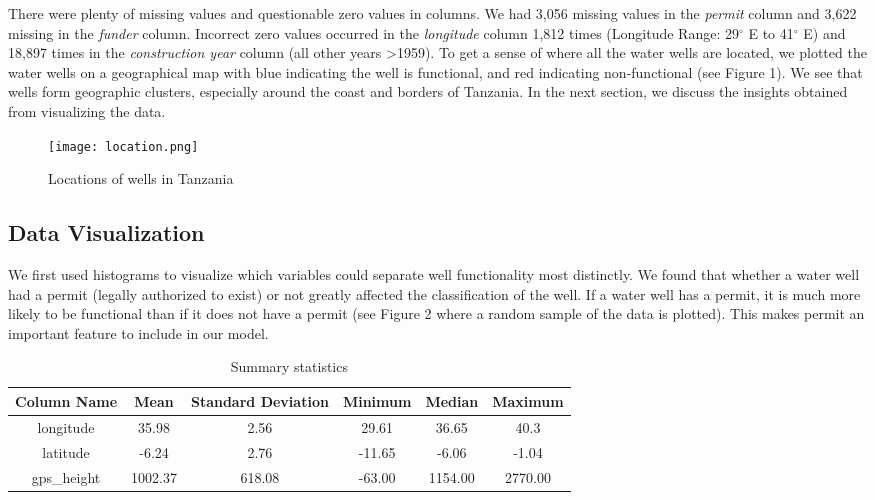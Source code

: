 \documentclass[10pt]{SelfArx} %
\begin{document}
There were plenty of missing values and questionable zero values in columns. We had 3,056 missing values in the \textit{permit} column and 3,622 missing in the \textit{funder} column. Incorrect zero values occurred in the \textit{longitude} column 1,812 times (Longitude Range: 29$^\circ$ E to 41$^\circ$ E) and 18,897 times in the \textit{construction year} column (all other years >1959). To get a sense of where all the water wells are located, we plotted the water wells on a geographical map with blue indicating the well is functional, and red indicating non-functional (see Figure 1). We see that wells form geographic clusters, especially around the coast and borders of Tanzania. In the next section, we discuss the insights obtained from visualizing the data.


\begin{figure}[ht]\centering
\captionsetup{skip=0.5cm}
\texttt{[image: location.png]}
\caption{Locations of wells in Tanzania}
\label{fig:map}
\end{figure}


\subsection{Data Visualization}

We first used histograms to visualize which variables could separate well functionality most distinctly. We found that whether a water well had a permit (legally authorized to exist) or not greatly affected the classification of the well. If a water well has a permit, it is much more likely to be functional than if it does not have a permit (see Figure 2 where a random sample of the data is plotted). This makes permit an important feature to include in our model.
\break

\begin{table*}[t]
  \centering
\caption{Summary statistics}
\begin{tabular}{ |c|c|c|c|c|c| }
      \hline
      Column Name & Mean & Standard Deviation & Minimum & Median & Maximum\\
      \hline
      \hline
      longitude & 35.98 & 2.56 & 29.61 & 36.65 & 40.3\\
      latitude & -6.24 & 2.76 & -11.65 & -6.06 & -1.04\\
      gps\_height & 1002.37 & 618.08 & -63.00 & 1154.00 & 2770.00\\
      \hline
  \end{tabular}
  \label{tab:2}
\end{table*}
\end{document}
